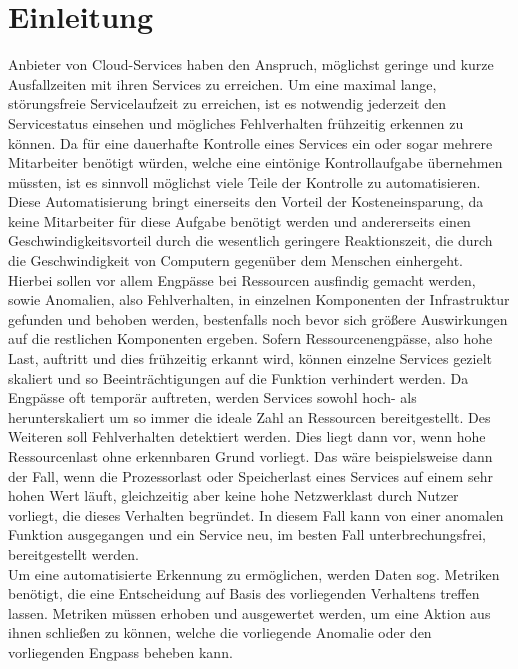\documentclass[a4paper,12pt]{scrartcl}
\title{}
\author{Johannes Bohlig}
\date{\today}
\begin{document}
\tableofcontents

\pagebreak

\section{Einleitung}

Anbieter von Cloud-Services haben den Anspruch, möglichst geringe und kurze Ausfallzeiten mit ihren Services zu erreichen. Um eine maximal lange, störungsfreie Servicelaufzeit zu erreichen, ist es notwendig jederzeit den Servicestatus einsehen und mögliches Fehlverhalten frühzeitig erkennen zu können. 
Da für eine dauerhafte Kontrolle eines Services ein oder sogar mehrere Mitarbeiter benötigt würden, welche eine eintönige Kontrollaufgabe übernehmen müssten, ist es sinnvoll möglichst viele Teile der Kontrolle zu automatisieren. Diese Automatisierung bringt einerseits den Vorteil der Kosteneinsparung, da keine Mitarbeiter für diese Aufgabe benötigt werden und andererseits einen Geschwindigkeitsvorteil durch die wesentlich geringere Reaktionszeit, die durch die Geschwindigkeit von Computern gegenüber dem Menschen einhergeht.\\
Hierbei sollen vor allem Engpässe bei Ressourcen ausfindig gemacht werden, sowie Anomalien, also Fehlverhalten, in einzelnen Komponenten der Infrastruktur gefunden und behoben werden, bestenfalls noch bevor sich größere Auswirkungen auf die restlichen Komponenten ergeben.
Sofern Ressourcenengpässe, also hohe Last, auftritt und dies frühzeitig erkannt wird, können einzelne Services gezielt skaliert und so Beeinträchtigungen auf die Funktion verhindert werden. Da Engpässe oft temporär auftreten, werden Services sowohl hoch- als herunterskaliert um so immer die ideale Zahl an Ressourcen bereitgestellt.
Des Weiteren soll Fehlverhalten detektiert werden. Dies liegt dann vor, wenn hohe Ressourcenlast ohne erkennbaren Grund vorliegt. Das wäre beispielsweise dann der Fall, wenn die Prozessorlast oder Speicherlast eines Services auf einem sehr hohen Wert läuft, gleichzeitig aber keine hohe Netzwerklast durch Nutzer vorliegt, die dieses Verhalten begründet. In diesem Fall kann von einer anomalen Funktion ausgegangen und ein Service neu, im besten Fall unterbrechungsfrei, bereitgestellt werden. \\
Um eine automatisierte Erkennung zu ermöglichen, werden Daten sog. Metriken benötigt, die eine Entscheidung auf Basis des vorliegenden Verhaltens treffen lassen. Metriken müssen erhoben und ausgewertet werden, um eine Aktion aus ihnen schließen zu können, welche die vorliegende Anomalie oder den vorliegenden Engpass beheben kann.\\
\end{document}
